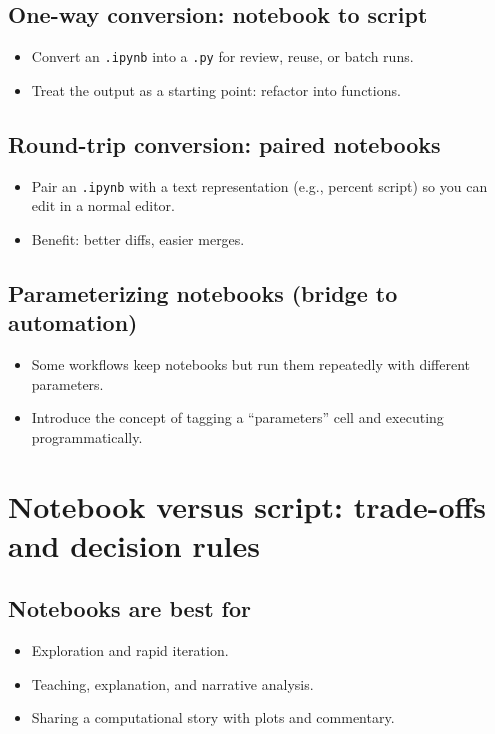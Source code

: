 \subsection{One-way conversion: notebook to script}
\begin{itemize}
\item Convert an \texttt{.ipynb} into a \texttt{.py} for review, reuse, or batch runs.
\item Treat the output as a starting point: refactor into functions.
\end{itemize}

\subsection{Round-trip conversion: paired notebooks}
\begin{itemize}
\item Pair an \texttt{.ipynb} with a text representation (e.g., percent script) so you can edit in a normal editor.
\item Benefit: better diffs, easier merges.
\end{itemize}

\subsection{Parameterizing notebooks (bridge to automation)}
\begin{itemize}
\item Some workflows keep notebooks but run them repeatedly with different parameters.
\item Introduce the concept of tagging a ``parameters'' cell and executing programmatically.
\end{itemize}

\section{Notebook versus script: trade-offs and decision rules}
\subsection{Notebooks are best for}
\begin{itemize}
\item Exploration and rapid iteration.
\item Teaching, explanation, and narrative analysis.
\item Sharing a computational story with plots and commentary.
\end{itemize}

